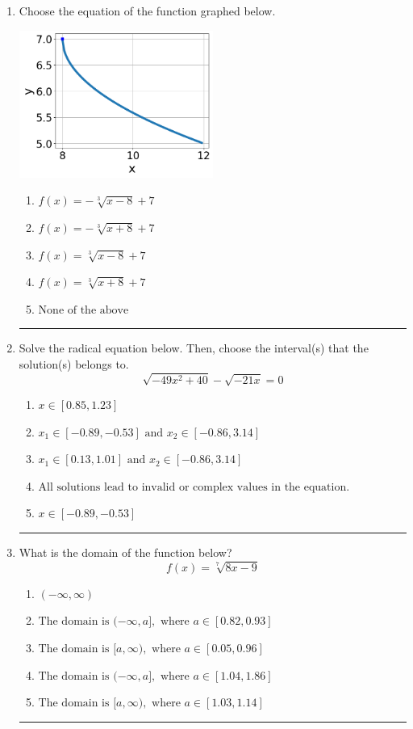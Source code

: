 \documentclass[14pt]{extbook}
\newcommand{\litem}[1]{\item#1\hspace*{-1cm}\rule{\textwidth}{0.4pt}}
\begin{document}
\begin{enumerate}
\litem{
Choose the equation of the function graphed below.
\begin{center}
    \includegraphics[width=0.5\textwidth]{../Figures/radicalGraphToEquationA.png}
\end{center}
\begin{enumerate}[label=\Alph*.]
\item \( f(x) = - \sqrt[3]{x - 8} + 7 \)
\item \( f(x) = - \sqrt[3]{x + 8} + 7 \)
\item \( f(x) = \sqrt[3]{x - 8} + 7 \)
\item \( f(x) = \sqrt[3]{x + 8} + 7 \)
\item \( \text{None of the above} \)

\end{enumerate} }
\litem{
Solve the radical equation below. Then, choose the interval(s) that the solution(s) belongs to.\[ \sqrt{-49 x^2 + 40} - \sqrt{-21 x} = 0 \]\begin{enumerate}[label=\Alph*.]
\item \( x \in [0.85,1.23] \)
\item \( x_1 \in [-0.89, -0.53] \text{ and } x_2 \in [-0.86,3.14] \)
\item \( x_1 \in [0.13, 1.01] \text{ and } x_2 \in [-0.86,3.14] \)
\item \( \text{All solutions lead to invalid or complex values in the equation.} \)
\item \( x \in [-0.89,-0.53] \)

\end{enumerate} }
\litem{
What is the domain of the function below?\[ f(x) = \sqrt[7]{8 x - 9} \]\begin{enumerate}[label=\Alph*.]
\item \( (-\infty, \infty) \)
\item \( \text{The domain is } (-\infty, a], \text{   where } a \in [0.82, 0.93] \)
\item \( \text{The domain is } [a, \infty), \text{   where } a \in [0.05, 0.96] \)
\item \( \text{The domain is } (-\infty, a], \text{   where } a \in [1.04, 1.86] \)
\item \( \text{The domain is } [a, \infty), \text{   where } a \in [1.03, 1.14] \)


\end{enumerate}}
\end{enumerate}
\end{document}
